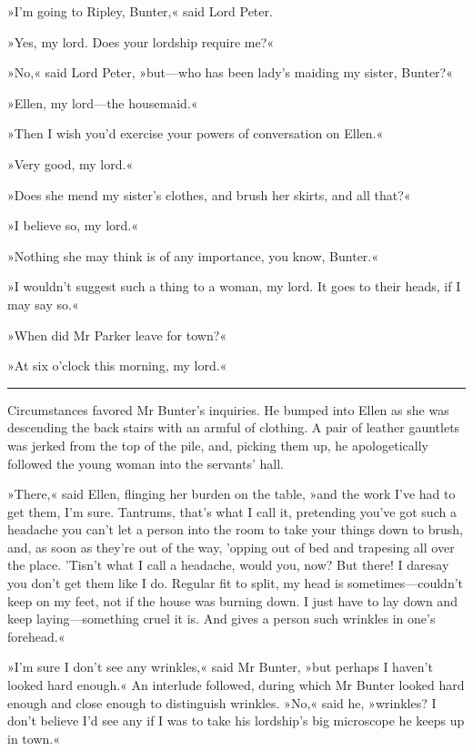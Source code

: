 »I'm going to Ripley, Bunter,« said Lord Peter.

»Yes, my lord. Does your lordship require me?«

»No,« said Lord Peter, »but\allowbreak---\allowbreak who has been lady's maiding my sister, Bunter?«

»Ellen, my lord\allowbreak---\allowbreak the housemaid.«

»Then I wish you'd exercise your powers of conversation on Ellen.«

»Very good, my lord.«

»Does she mend my sister's clothes, and brush her skirts, and all that?«

»I believe so, my lord.«

»Nothing she may think is of any importance, you know, Bunter.«

»I wouldn't suggest such a thing to a woman, my lord. It goes to their heads, if I may say so.«

»When did Mr Parker leave for town?«

»At six o'clock this morning, my lord.«

\noindent\hfil\rule{0.5\textwidth}{.4pt}\hfil

Circumstances favored Mr Bunter's inquiries. He bumped into Ellen as she was descending the back stairs with an armful of clothing. A pair of leather gauntlets was jerked from the top of the pile, and, picking them up, he apologetically followed the young woman into the servants' hall.

»There,« said Ellen, flinging her burden on the table, »and the work I've had to get them, I'm sure. Tantrums, that's what I call it, pretending you've got such a headache you can't let a person into the room to take your things down to brush, and, as soon as they're out of the way, 'opping out of bed and trapesing all over the place.  'Tisn't what I call a headache, would you, now? But there! I daresay you don't get them like I do. Regular fit to split, my head is sometimes\allowbreak---\allowbreak couldn't keep on my feet, not if the house was burning down.  I just have to lay down and keep laying\allowbreak---\allowbreak something cruel it is. And gives a person such wrinkles in one's forehead.«

»I'm sure I don't see any wrinkles,« said Mr Bunter, »but perhaps I haven't looked hard enough.« An interlude followed, during which Mr  Bunter looked hard enough and close enough to distinguish wrinkles.  »No,« said he, »wrinkles? I don't believe I'd see any if I was to take his lordship's big microscope he keeps up in town.«

